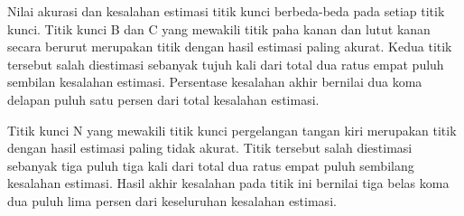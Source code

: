 Nilai akurasi dan kesalahan estimasi titik kunci berbeda-beda pada setiap titik kunci.
Titik kunci B dan C yang mewakili titik paha kanan dan lutut kanan secara berurut merupakan
titik dengan hasil estimasi paling akurat. Kedua titik tersebut salah diestimasi sebanyak tujuh kali
dari total dua ratus empat puluh sembilan kesalahan estimasi. Persentase kesalahan akhir
bernilai dua koma delapan puluh satu persen dari total kesalahan estimasi.

Titik kunci N yang mewakili titik kunci pergelangan tangan kiri merupakan titik dengan hasil estimasi
paling tidak akurat. Titik tersebut salah diestimasi sebanyak tiga puluh tiga kali dari total
dua ratus empat puluh sembilang kesalahan estimasi. Hasil akhir kesalahan pada titik ini bernilai
tiga belas koma dua puluh lima persen dari keseluruhan kesalahan estimasi.
